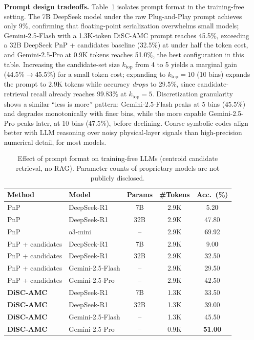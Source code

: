 \textbf{Prompt design tradeoffs.} Table~\ref{tab:disc_prompt_format} isolates prompt format in the training-free setting. The 7B DeepSeek model under the raw Plug-and-Play prompt achieves only 9\%, confirming that floating-point serialization overwhelms small models; Gemini-2.5-Flash with a 1.3K-token DiSC-AMC prompt reaches 45.5\%, exceeding a 32B DeepSeek PnP + candidates baseline (32.5\%) at under half the token cost, and Gemini-2.5-Pro at 0.9K tokens reaches 51.0\%, the best configuration in this table. Increasing the candidate-set size $k_{\mathrm{top}}$ from 4 to 5 yields a marginal gain (44.5\%$\to$45.5\%) for a small token cost; expanding to $k_{\mathrm{top}}=10$ (10 bins) expands the prompt to 2.9K tokens while accuracy \emph{drops} to 29.5\%, since candidate-retrieval recall already reaches 99.83\% at $k_{\mathrm{top}}=5$. Discretization granularity shows a similar ``less is more'' pattern: Gemini-2.5-Flash peaks at 5 bins (45.5\%) and degrades monotonically with finer bins, while the more capable Gemini-2.5-Pro peaks later, at 10 bins (47.5\%), before declining. Coarse symbolic codes align better with LLM reasoning over noisy physical-layer signals than high-precision numerical detail, for most models.

\begin{table}[htbp]
\centering
\caption[Effect of prompt format on training-free LLMs (centroid candidate retrieval, no RAG).]{Effect of prompt format on training-free LLMs (centroid candidate retrieval, no RAG). Parameter counts of proprietary models are not publicly disclosed.}
\label{tab:disc_prompt_format}
\begin{tabular}{llccc}
\toprule
Method & Model & Params & \#Tokens & Acc.\ (\%) \\
\midrule
PnP & DeepSeek-R1 & 7B & 2.9K & 5.20 \\
PnP & DeepSeek-R1 & 32B & 2.9K & 47.80 \\
PnP & o3-mini & -- & 2.9K & 69.92 \\
PnP + candidates & DeepSeek-R1 & 7B & 2.9K & 9.00 \\
PnP + candidates & DeepSeek-R1 & 32B & 2.9K & 32.50 \\
PnP + candidates & Gemini-2.5-Flash & -- & 2.9K & 29.50 \\
PnP + candidates & Gemini-2.5-Pro & -- & 2.9K & 42.50 \\
\textbf{DiSC-AMC} & DeepSeek-R1 & 7B & 1.3K & 33.50 \\
\textbf{DiSC-AMC} & DeepSeek-R1 & 32B & 1.3K & 39.00 \\
\textbf{DiSC-AMC} & Gemini-2.5-Flash & -- & 1.3K & 45.50 \\
\textbf{DiSC-AMC} & Gemini-2.5-Pro & -- & 0.9K & \textbf{51.00} \\
\bottomrule
\end{tabular}
\end{table}

